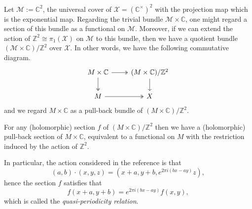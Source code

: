 \documentclass[11pt]{amsart}
\begin{document}
\begin{remark}
    Let $\mathcal{M} := \mathbb{C}^2$, the universal cover of $\mathcal{X} = (\mathbb{C}^{\times})^2$ with the projection map which is the exponential map.
    Regarding the trivial bundle $\mathcal{M} \times \mathbb{C}$, one might regard a section of this bundle as a functional on $\mathcal{M}$.
    Moreover, if we can extend the action of $\mathbb{Z}^2 \cong \pi_1(\mathcal{X})$ on $\mathcal{M}$ to this bundle, then we have a quotient bundle $(\mathcal{M} \times \mathbb{C})/\mathbb{Z}^2$ over $\mathcal{X}$.
    In other words, we have the following commutative diagram.
    \[
        \begin{tikzcd}
        M \times \mathbb{C} \arrow[r, two heads] \arrow[d, two heads]
        & (M \times \mathbb{C})/\mathbb{Z}^2 \arrow[d] \\
        M \arrow[r, two heads]
        & X
        \end{tikzcd}
    \]
    and we regard \( M \times \mathbb{C} \) as a pull-back bundle of \( (M \times \mathbb{C})/\mathbb{Z}^2 \).

    For any (holomorphic) section $f$ of \( (M \times \mathbb{C})/\mathbb{Z}^2 \) then we have a (holomorphic) pull-back section of $M \times \mathbb{C}$, equivalent to a functional on $M$ with the restriction induced by the action of $\mathbb{Z}^2$.

    In particular, the action considered in the reference is that
    \[
        (a,b) \cdot (x, y, z) = (x+a, y+b, e^{2\pi i(bx - ay)} z),
    \]
    hence the section $f$ satisfies that 
    \[
        f(x+a, y+b) = e^{2\pi i(bx - ay)} f(x,y),
    \]
    which is called the \emph{quasi-periodicity relation}.
\end{remark}


\printbibliography
% 
% 
\end{document}
